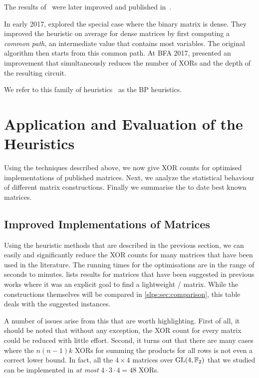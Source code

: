 The results of~\cite{MFCS:BoyMatPer08,SEA:BoyPer10} were later improved and published in~\cite{JC:BoyMatPer13}.

In early 2017, \textcite{EPRINT:VisSchPer17} explored the special case where the binary matrix is dense.
They improved the heuristic on average for dense matrices by first computing a \emph{common path}, an intermediate value that contains most variables.
The original algorithm then starts from this common path.
At BFA 2017, \textcite{BFA:BoyFinPer17} presented an improvement that simultaneously reduces the number of XORs and the depth of the resulting circuit.

We refer to this family of heuristics~\cite{MFCS:BoyMatPer08,SEA:BoyPer10,JC:BoyMatPer13,BFA:BoyFinPer17,EPRINT:VisSchPer17} as the \textsc{BP} heuristics.

\section{Application and Evaluation of the Heuristics}
\label{slps:sec:results}

Using the techniques described above, we now give XOR counts for optimised implementations of published matrices.
Next, we analyze the statistical behaviour of different matrix constructions.
Finally we summarise the to date best known matrices.

\subsection{Improved Implementations of Matrices}

Using the heuristic methods that are described in the previous section, we can easily and significantly reduce the XOR counts for many matrices that have been used in the literature.
The running times for the optimisations are in the range of seconds to minutes.
 lists results for matrices that have been suggested in previous works where it was an explicit goal to find a lightweight \MDS/ matrix.
While the constructions themselves will be compared in \cref{slps:sec:comparison}, this table deals with the suggested instances.

A number of issues arise from this that are worth highlighting.
First of all, it should be noted that without any exception, the XOR count for every matrix could be reduced with little effort.
Second, it turns out that there are many cases where the $n(n-1)k$ XORs for summing the products for all rows is not even a correct lower bound.
In fact, all the $4 \times 4$ matrices over $\mathrm{GL}(4, \mathbb{F}_2)$ that we studied can be implemented in \emph{at most} $4 \cdot 3 \cdot 4 = 48$ XORs.

